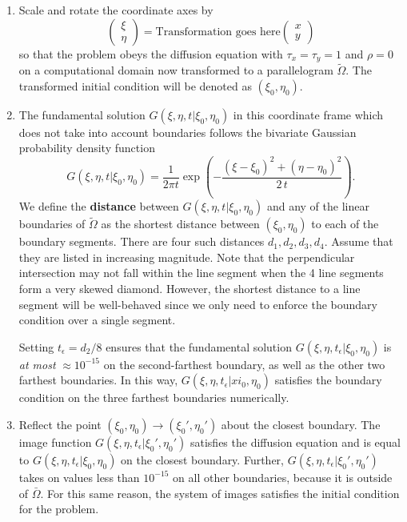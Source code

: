 \documentclass[10pt]{article}
\begin{document}
\begin{enumerate}[1.]
\item Scale and rotate the coordinate axes by
  \[
    \left( \begin{array}{c}
             \xi \\
             \eta
           \end{array} \right) = \mbox{Transformation goes here}
             \left( \begin{array}{cc}
             x \\
             y
           \end{array} \right) 
       \]
       so that the problem obeys the diffusion equation with
       $\tau_x = \tau_y = 1$ and $\rho = 0$ on a computational domain
       now transformed to a parallelogram $\tilde{\Omega}$. The
       transformed initial condition will be denoted as
       $(\xi_0, \eta_0)$.

     \item The fundamental solution $G(\xi,\eta,t | \xi_0, \eta_0)$ in
       this coordinate frame which does not take into account
       boundaries follows the bivariate Gaussian probability density
       function
  \[
    G(\xi,\eta,t | \xi_0, \eta_0) = \frac{1}{2\pi t} \exp\left(-\frac{(\xi-\xi_0)^2 +
        (\eta-\eta_0)^2}{2\,t} \right).
  \]
  We define the \textbf{distance} between
  $G(\xi,\eta,t | \xi_0, \eta_0)$ and any of the linear boundaries of
  $\tilde{\Omega}$ as the shortest distance between $(\xi_0, \eta_0)$
  to each of the boundary segments.  There are four such distances
  $d_1, d_2, d_3, d_4$. Assume that they are listed in increasing
  magnitude. Note that the perpendicular intersection may not fall
  within the line segment when the 4 line segments form a very skewed
  diamond. However, the shortest distance to a line segment will be
  well-behaved since we only need to enforce the boundary condition
  over a single segment.

  Setting $t_\epsilon = d_2/8$ ensures that the fundamental solution
  $G(\xi,\eta,t_\epsilon | \xi_0, \eta_0)$ is \textit{at most}
  $\approx 10^{-15}$ on the second-farthest boundary, as well as the
  other two farthest boundaries. In this way,
  $G(\xi,\eta,t_\epsilon | xi_0, \eta_0)$ satisfies the boundary
  condition on the three farthest boundaries numerically.

\item Reflect the point $(\xi_0, \eta_0) \to (\xi_0', \eta_0')$ about
  the closest boundary. The image function
  $G(\xi,\eta,t_\epsilon | \xi_0', \eta_0')$ satisfies the diffusion
  equation and is equal to $G(\xi,\eta,t_\epsilon | \xi_0, \eta_0)$ on
  the closest boundary. Further,
  $G(\xi,\eta,t_\epsilon | \xi_0', \eta_0')$ takes on values less than
  $10^{-15}$ on all other boundaries, because it is outside of
  $\bar{\Omega}$. For this same reason, the system of images satisfies
  the initial condition for the problem.


\end{enumerate}
\end{document}
